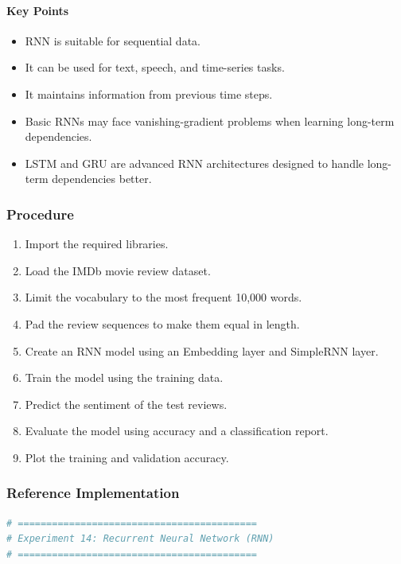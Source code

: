 \documentclass[a4paper,11pt]{article}
\begin{document}
\begin{itemize}
\paragraph{Key Points}
\begin{itemize}
    \item RNN is suitable for sequential data.
    \item It can be used for text, speech, and time-series tasks.
    \item It maintains information from previous time steps.
    \item Basic RNNs may face vanishing-gradient problems when learning long-term dependencies.
    \item LSTM and GRU are advanced RNN architectures designed to handle long-term dependencies better.
\end{itemize}

\subsubsection{Procedure}
\begin{enumerate}
    \item Import the required libraries.
    \item Load the IMDb movie review dataset.
    \item Limit the vocabulary to the most frequent 10,000 words.
    \item Pad the review sequences to make them equal in length.
    \item Create an RNN model using an Embedding layer and SimpleRNN layer.
    \item Train the model using the training data.
    \item Predict the sentiment of the test reviews.
    \item Evaluate the model using accuracy and a classification report.
    \item Plot the training and validation accuracy.
\end{enumerate}

\subsubsection{Reference Implementation}
\begin{lstlisting}[language=Python, caption={RNN Implementation}]
# ==========================================
# Experiment 14: Recurrent Neural Network (RNN)
# ==========================================


\end{lstlisting}
\end{itemize}
\end{document}
